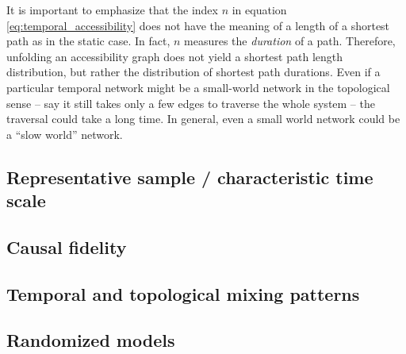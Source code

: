 It is important to emphasize that the index $n$ in equation \eqref{eq:temporal_accessibility} does not have the meaning of a length of a shortest path as in the static case.
In fact, $n$ measures the \emph{duration} of a path.
Therefore, unfolding an accessibility graph does not yield a shortest path length distribution, but rather the distribution of shortest path durations.
Even if a particular temporal network might be a small-world network in the topological sense -- say it still takes only a few edges to traverse the whole system -- the traversal could take a long time.
In general, even a small world network could be a ``slow world'' network. 




\subsection{Representative sample / characteristic time scale}

\subsection{Causal fidelity}

\subsection{Temporal and topological mixing patterns}

\subsection{Randomized models}\label{sec:randomized_models_tvg}






